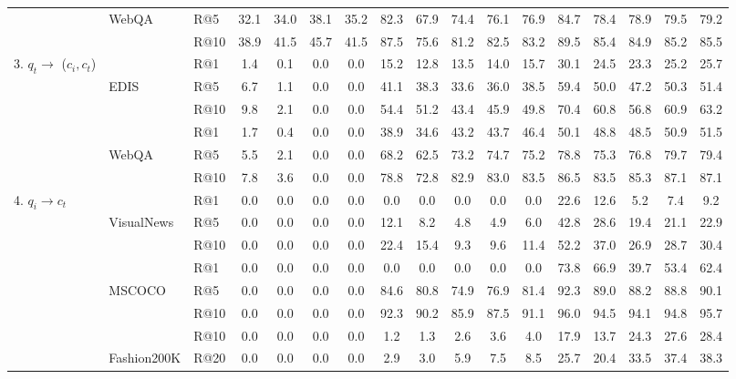 \begin{table}
{\begin{tabular}{lllcccc|ccccc|ccccc}
         & WebQA     & R@5& 32.1 & 34.0 & 38.1 & 35.2 & 82.3 & 67.9 & 74.4 &76.1 & 76.9 &84.7 & 78.4 &78.9&79.5 &79.2\\
         &      & R@10& 38.9 & 41.5 & 45.7 & 41.5 & 87.5 & 75.6 & 81.2 &82.5 & 83.2 &89.5 & 85.4 &84.9&85.2 &85.5\\
         \midrule
         \multirow{6}{*}{3. $q_t \to$ ($c_i, c_t$)}
         &   &  R@1& 1.4 & 0.1 & 0.0 & 0.0 & 15.2 & 12.8 & 13.5 &14.0 & 15.7 &30.1 & 24.5 &23.3&25.2 &25.7\\
         & EDIS  & R@5 & 6.7 & 1.1 & 0.0 & 0.0 & 41.1 & 38.3 & 33.6 &36.0 & 38.5 &59.4 & 50.0 &47.2&50.3 &51.4\\
         &   &  R@10& 9.8 & 2.1 & 0.0 & 0.0 & 54.4 & 51.2 & 43.4 &45.9 & 49.8 &70.4 & 60.8 &56.8&60.9 &63.2\\
         \cmidrule(lr){2-17}
         &  &  R@1& 1.7 & 0.4 & 0.0 & 0.0 & 38.9 & 34.6 & 43.2 &43.7 & 46.4 &50.1 & 48.8 &48.5&50.9 &51.5\\
         & WebQA &  R@5& 5.5 & 2.1 & 0.0 & 0.0 & 68.2 & 62.5 & 73.2 &74.7 & 75.2 &78.8 & 75.3 &76.8&79.7 &79.4\\
         &  &  R@10& 7.8 & 3.6 & 0.0 & 0.0 & 78.8 & 72.8 & 82.9 &83.0 & 83.5 &86.5 & 83.5 &85.3&87.1 &87.1\\
         \midrule
         \multirow{9}{*}{4. $q_i \to c_t$}
         &               & R@1& 0.0 & 0.0 & 0.0 & 0.0 & 0.0 & 0.0 & 0.0 &0.0 & 0.0 &22.6 & 12.6 &5.2&7.4 &9.2\\
         & VisualNews              & R@5& 0.0 & 0.0 & 0.0 & 0.0 & 12.1 & 8.2 & 4.8 &4.9 & 6.0 &42.8 & 28.6 &19.4&21.1 &22.9\\
         &               & R@10& 0.0 & 0.0 & 0.0 & 0.0 & 22.4 & 15.4 & 9.3 &9.6 & 11.4 &52.2 & 37.0 &26.9&28.7 &30.4\\
         \cmidrule(lr){2-17}
         &                 & R@1& 0.0 & 0.0 & 0.0 & 0.0 & 0.0 & 0.0 & 0.0 &0.0 & 0.0 &73.8 & 66.9 &39.7&53.4 &62.4\\
         & MSCOCO                & R@5& 0.0 & 0.0 & 0.0 & 0.0 & 84.6 & 80.8 & 74.9 &76.9 & 81.4 &92.3 & 89.0 &88.2&88.8 &90.1\\
         &                 & R@10& 0.0 & 0.0 & 0.0 & 0.0 & 92.3 & 90.2 & 85.9 &87.5 & 91.1 &96.0 & 94.5 &94.1&94.8 &95.7\\
         \cmidrule(lr){2-17}
         &           & R@10& 0.0 & 0.0 & 0.0 & 0.0 & 1.2 & 1.3 & 2.6 &3.6 & 4.0 &17.9 & 13.7 &24.3&27.6 &28.4\\
         & Fashion200K          & R@20& 0.0 & 0.0 & 0.0 & 0.0 & 2.9 & 3.0 & 5.9 &7.5 & 8.5 &25.7 & 20.4 &33.5&37.4 &38.3\\

\end{tabular}}
\end{table}
